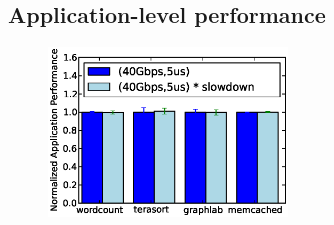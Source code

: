 \subsection{Application-level performance}
\label{ssec:alp}

%
\begin{figure}
  \centering
    \includegraphics[width = 2.5in]{img/graph12_slowdown.eps} 
  \caption{\small{}}
  \label{fig:appfabric}
\end{figure}
%
